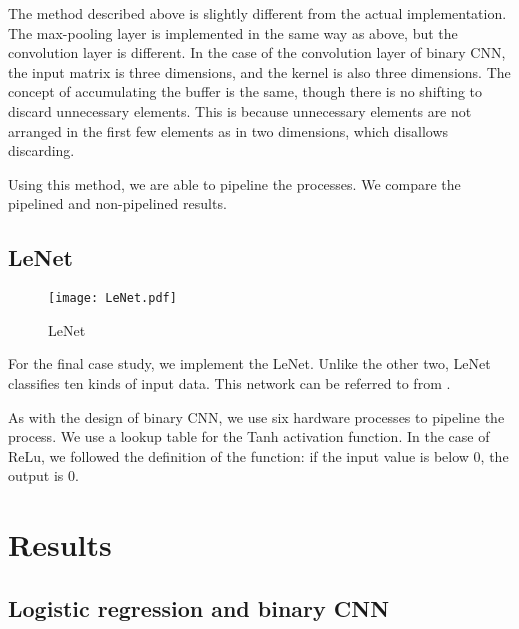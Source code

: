 The method described above is slightly different from the actual implementation. The max-pooling layer is implemented in the same way as above, but the convolution layer is different. In the case of the convolution layer of binary CNN, the input matrix is three dimensions, and the kernel is also three dimensions. The concept of accumulating the buffer is the same, though there is no shifting to discard unnecessary elements. This is because unnecessary elements are not arranged in the first few elements as in two dimensions, which disallows discarding.

Using this method, we are able to pipeline the processes. We compare the pipelined and non-pipelined results.



\subsection{LeNet}
\begin{figure}[tbp]
  \centering
  \texttt{[image: LeNet.pdf]}
  \caption{LeNet}%
  \label{fig:lenet}
\end{figure}
For the final case study, we implement the LeNet. Unlike the other two, LeNet classifies ten kinds of input data. This network can be referred to from .

As with the design of binary CNN, we use six hardware processes to pipeline the process. We use a lookup table for the Tanh activation function. In the case of ReLu, we followed the definition of the function: if the input value is below 0, the output is 0.

\section{Results} \label{sec:results}
\subsection{Logistic regression and binary CNN}

